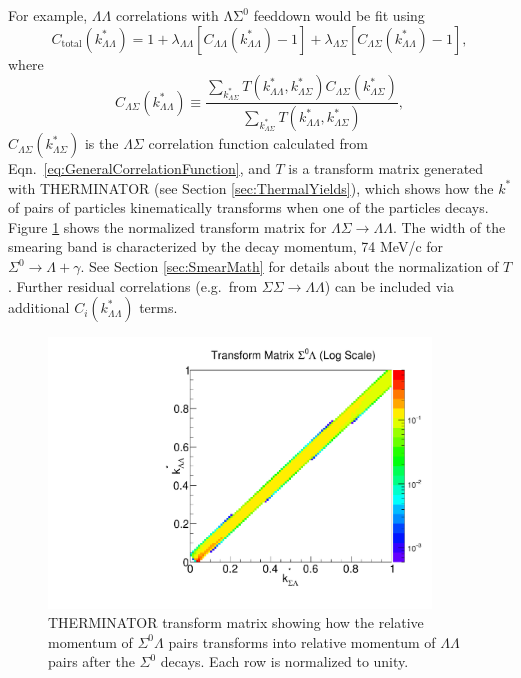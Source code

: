 For example, $\Lambda\Lambda$ correlations with $\mathrm{\Lambda\Sigma^0}$ feeddown would be fit using 
\begin{equation}
\label{eq:Residual}
C_{\mathrm{total}}(k^*_{\Lambda\Lambda})= 1 + \lambda_{\Lambda\Lambda}[C_{\Lambda\Lambda}(k^*_{\Lambda\Lambda})-1]+\lambda_{\Lambda\Sigma}[C_{\Lambda\Sigma}(k^*_{\Lambda\Lambda})-1],
\end{equation}
where 
\begin{equation}
\label{eq:ResCorSmear}
C_{\Lambda\Sigma}(k^*_{\Lambda\Lambda}) \equiv \frac{\displaystyle\sum\limits_{k^*_{\Lambda\Sigma}}T(k^*_{\Lambda\Lambda},k^*_{\Lambda\Sigma})C_{\Lambda\Sigma}(k^*_{\Lambda\Sigma})}{\displaystyle\sum\limits_{k^*_{\Lambda\Sigma}}T(k^*_{\Lambda\Lambda},k^*_{\Lambda\Sigma})},
\end{equation}
$C_{\Lambda\Sigma}(k^*_{\Lambda\Sigma})$ is the $\Lambda\Sigma$ correlation function calculated from Eqn.\ \ref{eq:GeneralCorrelationFunction}, and $T$ is a transform matrix generated with THERMINATOR \cite{Chojnacki:2011hb} (see Section \ref{sec:ThermalYields}), which shows how the $k^*$ of pairs of particles kinematically transforms when one of the particles decays.  
Figure \ref{fig:TherminatorLS} shows the normalized transform matrix for $\Lambda\Sigma \rightarrow \Lambda\Lambda$.
The width of the smearing band is characterized by the decay momentum, 74 MeV/c for $\Sigma^0 \rightarrow \Lambda + \gamma$.
See Section \ref{sec:SmearMath} for details about the normalization of $T$.
Further residual correlations (e.g.\ from $\Sigma\Sigma \rightarrow \Lambda\Lambda$) can be included via additional $C_i(k^*_{\Lambda\Lambda})$ terms.

\begin{figure}[hbt]
\begin{center}
\includegraphics[width=24pc]{Figures/TransformMatrices/2016-7-20-TransformMatrixSigmaLambdaNormLog.pdf}
\end{center}
\caption[Transform matrix for $k^*_{\Sigma^0\Lambda} \rightarrow k^*_{\Lambda\Lambda}$]{THERMINATOR \cite{Chojnacki:2011hb} transform matrix showing how the relative momentum of $\Sigma^0\Lambda$ pairs transforms into relative momentum of $\Lambda\Lambda$ pairs after the $\Sigma^0$ decays. Each row is normalized to unity.}
\label{fig:TherminatorLS}
\end{figure}

